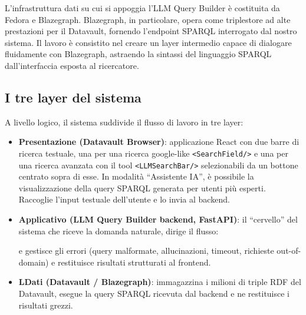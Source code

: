 \documentclass[12pt,a4paper,oneside]{book}
\newcommand{\code}[1]{\colorbox{light-gray}{\texttt{#1}}}
\begin{document}
  L'infrastruttura dati su cui si appoggia l'LLM Query Builder è costituita da Fedora e Blazegraph. 
  Blazegraph, in particolare, opera come triplestore ad alte prestazioni per il Datavault, fornendo l'endpoint SPARQL interrogato dal nostro sistema.
  Il lavoro è consistito nel creare un layer intermedio capace di dialogare fluidamente con Blazegraph, astraendo la sintassi del linguaggio SPARQL dall'interfaccia esposta al ricercatore.

  \subsection{I tre layer del sistema}\label{subsec:tre_layer}
    A livello logico, il sistema suddivide il flusso di lavoro in tre layer:
    \begin{itemize}
      \item \textbf{Presentazione (Datavault Browser)}: applicazione React con due barre di ricerca testuale, una per una ricerca google-like \code{<SearchField/>} e una per una ricerca avanzata con il tool \code{<LLMSearchBar/>} selezionabili da un bottone centrato sopra di esse.
      In modalità ``Assistente IA'', è possibile la visualizzazione della query SPARQL generata per utenti più esperti. Raccoglie l'input testuale dell'utente e lo invia al backend.
      \item \textbf{Applicativo (LLM Query Builder backend, FastAPI)}: il ``cervello'' del sistema che riceve la domanda naturale, dirige il flusso:
      
      \begin{center}
      \end{center}

      e gestisce gli errori (query malformate, allucinazioni, timeout, richieste out-of-domain) e restituisce risultati strutturati al frontend.
      \item \textbf{LDati (Datavault / Blazegraph)}: immagazzina i milioni di triple RDF del Datavault, esegue la query SPARQL ricevuta dal backend e ne restituisce i risultati grezzi.
    \end{itemize}
\end{document}
